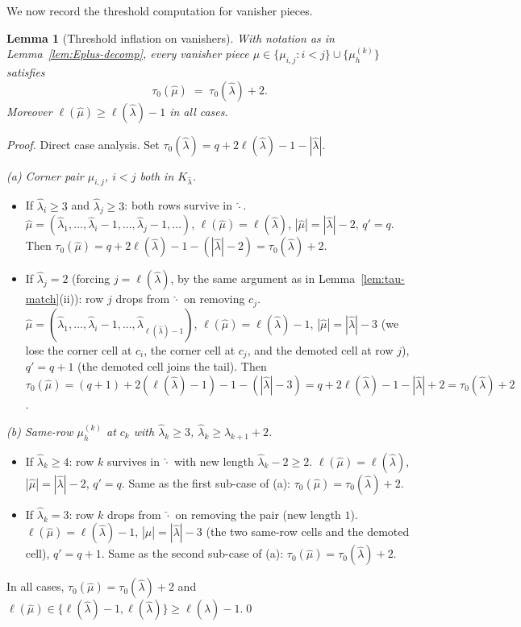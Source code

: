\documentclass[11pt]{article}
\newtheorem{lemma}[theorem]{Lemma}
\theoremstyle{definition}
\newcommand{\hatl}{\widehat\lambda}
\newcommand{\hatm}{\widehat\mu}
\newcommand{\elh}{\ell(\hatl)}
\begin{document}
We now record the threshold computation for vanisher pieces.

\begin{lemma}[Threshold inflation on vanishers]\label{lem:vanisher-tau}
With notation as in Lemma~\ref{lem:Eplus-decomp}, every vanisher
piece $\mu \in \{\mu_{i,j} : i < j\} \cup \{\mu_h^{(k)}\}$ satisfies
\[
   \tau_0(\widehat{\mu})
   \;=\; \tau_0(\hatl) + 2.
\]
Moreover $\ell(\hatm) \ge \elh - 1$ in all cases.
\end{lemma}

\begin{proof}
Direct case analysis.  Set $\tau_0(\hatl) = q + 2\elh - 1 - |\hatl|$.

\smallskip\emph{(a) Corner pair $\mu_{i,j}$, $i < j$ both in $K_\hatl$.}
\begin{itemize}[topsep=0.2em,itemsep=0.1em]
\item If $\hatl_i \ge 3$ and $\hatl_j \ge 3$: both rows survive in
   $\hat{\cdot}$.  $\hatm = (\hatl_1, \ldots, \hatl_i - 1, \ldots,
   \hatl_j - 1, \ldots)$, $\ell(\hatm) = \elh$, $|\hatm| = |\hatl| - 2$,
   $q' = q$.  Then $\tau_0(\hatm) = q + 2\elh - 1 - (|\hatl| - 2) =
   \tau_0(\hatl) + 2$.
\item If $\hatl_j = 2$ (forcing $j = \elh$, by the same argument as in
   Lemma~\ref{lem:tau-match}(ii)): row $j$ drops from $\hat{\cdot}$ on
   removing $c_j$.  $\hatm = (\hatl_1, \ldots, \hatl_i - 1, \ldots,
   \hatl_{\elh - 1})$, $\ell(\hatm) = \elh - 1$, $|\hatm| = |\hatl| - 3$
   (we lose the corner cell at $c_i$, the corner cell at $c_j$, and
   the demoted cell at row $j$), $q' = q + 1$ (the demoted cell joins
   the tail).  Then
   $\tau_0(\hatm) = (q+1) + 2(\elh-1) - 1 - (|\hatl| - 3) = q + 2\elh
   - 1 - |\hatl| + 2 = \tau_0(\hatl) + 2$.
\end{itemize}

\smallskip\emph{(b) Same-row $\mu_h^{(k)}$ at $c_k$ with $\hatl_k \ge 3$,
$\hatl_k \ge \hatl_{k+1} + 2$.}
\begin{itemize}[topsep=0.2em,itemsep=0.1em]
\item If $\hatl_k \ge 4$: row $k$ survives in $\hat{\cdot}$ with new
   length $\hatl_k - 2 \ge 2$.  $\ell(\hatm) = \elh$, $|\hatm| = |\hatl|
   - 2$, $q' = q$.  Same as the first sub-case of (a):
   $\tau_0(\hatm) = \tau_0(\hatl) + 2$.
\item If $\hatl_k = 3$: row $k$ drops from $\hat{\cdot}$ on removing
   the pair (new length $1$).  $\ell(\hatm) = \elh - 1$, $|\hatm| =
   |\hatl| - 3$ (the two same-row cells and the demoted cell), $q' =
   q + 1$.  Same as the second sub-case of (a):
   $\tau_0(\hatm) = \tau_0(\hatl) + 2$.
\end{itemize}

In all cases, $\tau_0(\hatm) = \tau_0(\hatl) + 2$ and $\ell(\hatm) \in
\{\elh - 1, \elh\} \ge \elh - 1$.\qed
\end{proof}
\end{document}
